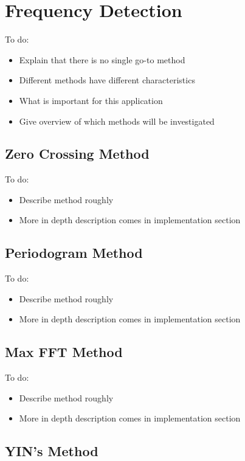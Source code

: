 \section{Frequency Detection}

\color{red}
To do:
\begin{itemize}
	\item Explain that there is no single go-to method
	\item Different methods have different characteristics
	\item What is important for this application
	\item Give overview of which methods will be investigated
\end{itemize}
\color{black}

\subsection{Zero Crossing Method}

\color{red}
To do:
\begin{itemize}
	\item Describe method roughly
	\item More in depth description comes in implementation section
\end{itemize}
\color{black}

\subsection{Periodogram Method}

\color{red}
To do:
\begin{itemize}
	\item Describe method roughly
	\item More in depth description comes in implementation section
\end{itemize}
\color{black}

\subsection{Max FFT Method}

\color{red}
To do:
\begin{itemize}
	\item Describe method roughly
	\item More in depth description comes in implementation section
\end{itemize}
\color{black}

\subsection{YIN's Method}

